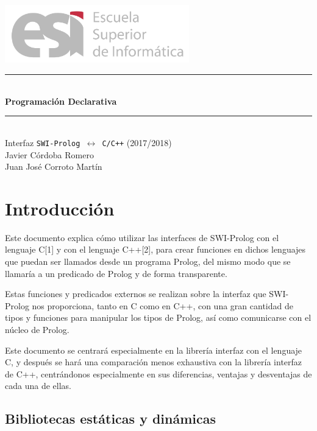\documentclass[a4paper]{article}
\begin{document}
\renewcommand{\contentsname}{Índice}

\begin{titlepage}
\begin{center}

\includegraphics[width=0.6\textwidth]{logoesi}\\[5cm]

\rule{\linewidth}{0.5mm} \\[0.4cm]
{ \huge \bfseries Programación Declarativa\\[0.4cm] }
\rule{\linewidth}{0.5mm} \\[1.5cm]
{\huge Interfaz \texttt{SWI-Prolog $\longleftrightarrow$ C/C++} (2017/2018)}\\[0.5cm]

\large{Javier Córdoba Romero}\\
\large{Juan José Corroto Martín}\\

\end{center}
\end{titlepage}

\tableofcontents
\clearpage

\section{Introducción}

Este documento explica cómo utilizar las interfaces de SWI-Prolog con el lenguaje C[1] y con el lenguaje C++[2], para crear funciones en dichos lenguajes que puedan ser llamados desde un programa Prolog, del mismo modo que se llamaría a un predicado de Prolog y de forma transparente.

Estas funciones y predicados externos se realizan sobre la interfaz que SWI-Prolog nos proporciona, tanto en C como en C++, con una gran cantidad de tipos y funciones para manipular los tipos de Prolog, así como comunicarse con el núcleo de Prolog.

Este documento se centrará especialmente en la librería interfaz con el lenguaje C, y después se hará una comparación menos exhaustiva con la librería interfaz de C++, centrándonos especialmente en sus diferencias, ventajas y desventajas de cada una de ellas.
\subsection{Bibliotecas estáticas y dinámicas}
\end{document}
